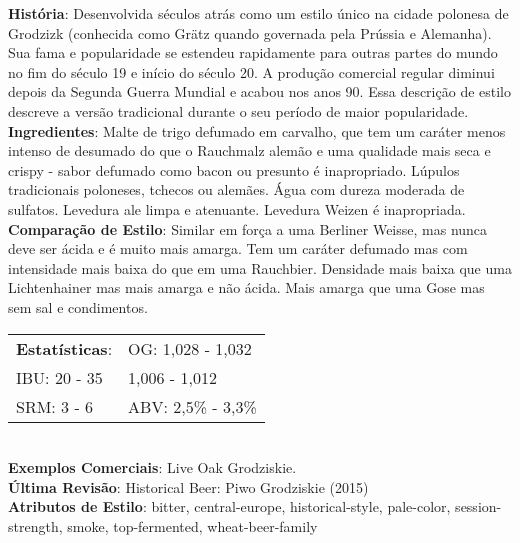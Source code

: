 \textbf{História}: Desenvolvida séculos atrás como um estilo único na cidade polonesa de Grodzizk (conhecida como Grätz quando governada pela Prússia e Alemanha). Sua fama e popularidade se estendeu rapidamente para outras partes do mundo no fim do século 19 e início do século 20. A produção comercial regular diminui depois da Segunda Guerra Mundial e acabou nos anos 90. Essa descrição de estilo descreve a versão tradicional durante o seu período de maior popularidade. \\
\textbf{Ingredientes}: Malte de trigo defumado em carvalho, que tem um caráter menos intenso de desumado do que o Rauchmalz alemão e uma qualidade mais seca e crispy - sabor defumado como bacon ou presunto é inapropriado. Lúpulos tradicionais poloneses, tchecos ou alemães. Água com dureza moderada de sulfatos. Levedura ale limpa e atenuante. Levedura Weizen é inapropriada. \\
\textbf{Comparação de Estilo}: Similar em força a uma Berliner Weisse, mas nunca deve ser ácida e é muito mais amarga. Tem um caráter defumado mas com intensidade mais baixa do que em uma Rauchbier. Densidade mais baixa que uma Lichtenhainer mas mais amarga e não ácida. Mais amarga que uma Gose mas sem sal e condimentos. \\
\begin{tabular}{@{}p{35mm}p{35mm}@{}}
  \textbf{Estatísticas}: & OG: 1,028 - 1,032 \\
  IBU: 20 - 35  & 1,006 - 1,012  \\
  SRM: 3 - 6 & ABV: 2,5\% - 3,3\%
\end{tabular}\\
\textbf{Exemplos Comerciais}: Live Oak Grodziskie. \\
\textbf{Última Revisão}: Historical Beer: Piwo Grodziskie (2015) \\
\textbf{Atributos de Estilo}: bitter, central-europe, historical-style, pale-color, session-strength, smoke, top-fermented, wheat-beer-family
